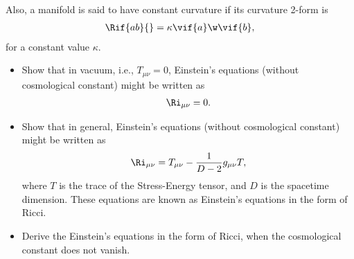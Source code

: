 Also, a manifold is said to have constant curvature if its curvature 2-form is
\begin{align}
  \Rif{ab}{} = \kappa\vif{a}\w\vif{b},
\end{align}
for a constant value $\kappa$.

\begin{Ebox}
  \begin{itemize}
  \item Show that in vacuum, i.e., $T_{\mu\nu}=0$, Einstein's equations (without cosmological constant) might be written as
    \begin{align}
      \Ri_{\mu\nu}=0.
    \end{align}
  \item Show that in general, Einstein's equations  (without cosmological constant) might be written as
    \begin{align}
      \Ri_{\mu\nu}= T_{\mu\nu}-\frac{1}{D-2}g_{\mu\nu} T,
    \end{align}
    where $T$ is the trace of the Stress-Energy tensor,  and  $D$ is the spacetime dimension. These equations are known as Einstein's equations in the form of Ricci.
  \item Derive the Einstein's equations in the form of Ricci, when the cosmological constant does not vanish.
  \end{itemize}
\end{Ebox}



